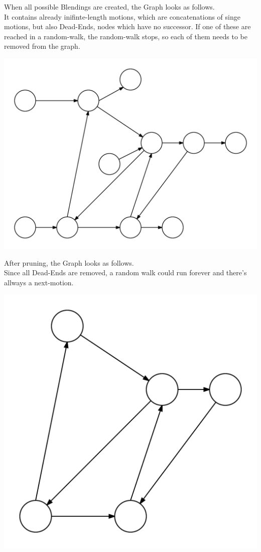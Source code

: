\documentclass[a4paper,10pt]{scrartcl}
\begin{document}
When all possible Blendings are created, the Graph looks as follows.
\\
It contains already inifinte-length motions, which are concatenations of singe motions, but also Dead-Ends, nodes which have no successor.
If one of these are reached in a random-walk, the random-walk stops, so each of them needs to be removed from the graph.
 
\includegraphics[width=\textwidth/2]{img/4_GraphAfterAllBlends.png}


After pruning, the Graph looks as follows.
\\
Since all Dead-Ends are removed, a random walk could run forever and there's allways a next-motion.

\includegraphics[width=\textwidth/2]{img/5_GraphAfterPruning.png}
\end{document}
